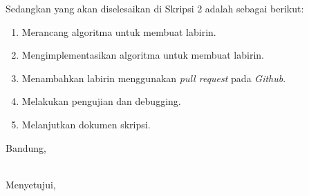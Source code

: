 \documentclass[a4paper,twoside]{article}
\begin{document}
Sedangkan yang akan diselesaikan di Skripsi 2 adalah sebagai berikut:
\begin{enumerate}
\item Merancang algoritma untuk membuat labirin. 
\item Mengimplementasikan algoritma untuk membuat labirin.
\item Menambahkan labirin menggunakan \textit{pull request} pada \textit{Github}.
\item Melakukan pengujian dan debugging.
\item Melanjutkan dokumen skripsi.
\end{enumerate}

\vspace{1cm}
\centering Bandung, \tanggal\\
\vspace{2cm} \nama \\ 
\vspace{1cm}

Menyetujui, \\
\end{document}
